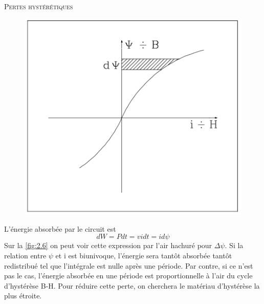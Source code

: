 	\textsc{Pertes hystérétiques}\\
	\begin{figure}
	\vspace{-5mm}
	\includegraphics[scale=0.4]{ch2/image6} 
	\label{fig:2.6}
	\end{figure}
	L'énergie absorbée par le circuit est
	\begin{equation}
		dW = Pdt = vidt = id\psi
	\end{equation}
	Sur la \autoref{fig:2.6} on peut voir cette expression par l'air hachuré pour $\Delta \psi$. Si la relation entre $\psi$ et i est biunivoque, l'énergie sera tantôt absorbée tantôt redistribué tel que l'intégrale est nulle après une période. Par contre, si ce n'est pas le cas, l'énergie absorbée en une période est proportionnelle à l'air du cycle d'hystérèse B-H. Pour réduire cette perte, on cherchera le matériau d'hystérèse la plus étroite. \\
	

